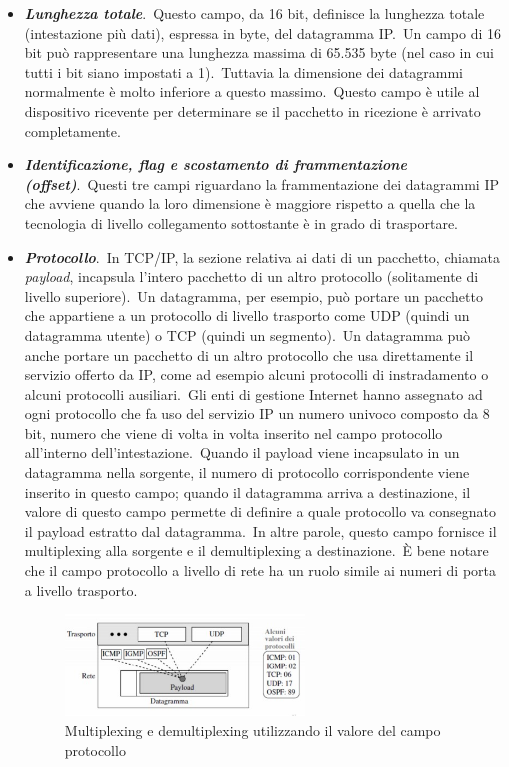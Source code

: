 \begin{itemize}
    \item \textbf{\emph{Lunghezza totale}}.\
          Questo campo, da 16 bit, definisce la lunghezza totale (intestazione più dati), espressa in byte, del datagramma IP.\
          Un campo di 16 bit può rappresentare una lunghezza massima di 65.535 byte (nel caso in cui tutti i bit siano impostati a 1).\
          Tuttavia la dimensione dei datagrammi normalmente è molto inferiore a questo massimo.\
          Questo campo è utile al dispositivo ricevente per determinare se il pacchetto in ricezione è arrivato completamente.
    \item \textbf{\emph{Identificazione, flag e scostamento di frammentazione (offset)}}.\
          Questi tre campi riguardano la frammentazione dei datagrammi IP che avviene quando la loro dimensione è maggiore rispetto a quella che la tecnologia di livello collegamento sottostante è in grado di trasportare.
    \item \textbf{\emph{Protocollo}}.\
          In TCP/IP, la sezione relativa ai dati di un pacchetto, chiamata \emph{payload}, incapsula l'intero pacchetto di un altro protocollo (solitamente di livello superiore).\
          Un datagramma, per esempio, può portare un pacchetto che appartiene a un protocollo di livello trasporto come UDP (quindi un datagramma utente) o TCP (quindi un segmento).\
          Un datagramma può anche portare un pacchetto di un altro protocollo che usa direttamente il servizio offerto da IP, come ad esempio alcuni protocolli di instradamento o alcuni protocolli ausiliari.\
          Gli enti di gestione Internet hanno assegnato ad ogni protocollo che fa uso del servizio IP un numero univoco composto da 8 bit, numero che viene di volta in volta inserito nel campo protocollo all'interno dell'intestazione.\
          Quando il payload viene incapsulato in un datagramma nella sorgente, il numero di protocollo corrispondente viene inserito in questo campo; quando il datagramma arriva a destinazione, il valore di questo campo permette di definire a quale protocollo va consegnato il payload estratto dal datagramma.\
          In altre parole, questo campo fornisce il multiplexing alla sorgente e il demultiplexing a destinazione.\
          È bene notare che il campo protocollo a livello di rete ha un ruolo simile ai numeri di porta a livello trasporto.
          \begin{figure}[H]
              \centering
              \includegraphics[width = 0.6\textwidth]{immagini/Multiplexing_Demultiplexing.jpg}
              \caption*{Multiplexing e demultiplexing utilizzando il valore del campo protocollo}
          \end{figure}


\end{itemize}
